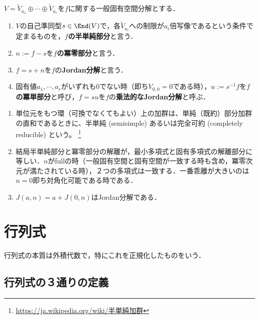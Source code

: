 \documentclass[uplatex, dvipdfmx]{jsreport}
\begin{document}
\begin{definition}
    $V=\widetilde{V}_{a_1}\oplus\cdots\oplus\widetilde{V}_{a_r}$を$f$に関する一般固有空間分解とする．
    \begin{enumerate}
        \item $V$の自己準同型$s\in\End(V)$で，各$\widetilde{V}_{a_i}$への制限が$a_i$倍写像であるという条件で定まるものを，\textbf{$f$の半単純部分}と言う．
        \item $n:=f-s$を\textbf{$f$の冪零部分}と言う．
        \item $f=s+n$を$f$の\textbf{Jordan分解}と言う．
        \item 固有値$a_1,\cdots,a_r$がいずれも$0$でない時（即ち$V_{0,0}=0$である時），$u:=s^{-1}f$を\textbf{$f$の冪単部分}と呼び，$f=su$を$f$の\textbf{乗法的なJordan分解}と呼ぶ．
    \end{enumerate}
\end{definition}
\begin{remark}\mbox{}
    \begin{enumerate}
        \item 単位元をもつ環（可換でなくてもよい）上の加群は、単純（既約）部分加群の直和であるときに、半単純 (semisimple) あるいは完全可約 (completely reducible) という。 \footnote{\url{https://ja.wikipedia.org/wiki/半単純加群}}
        \item 結局半単純部分と冪零部分の解離が，最小多項式と固有多項式の解離部分に等しい．$n$がfullの時（一般固有空間と固有空間が一致する時も含め，冪零次元が満たされている時），２つの多項式は一致する．一番乖離が大きいのは$n=0$即ち対角化可能である時である．
        \item $J(a,n)=a+J(0,n)$はJordan分解である．
    \end{enumerate}
\end{remark}

\section{行列式}

\begin{tcolorbox}[colframe=ForestGreen, colback=ForestGreen!10!white,breakable,colbacktitle=ForestGreen!40!white,coltitle=black,fonttitle=\bfseries\sffamily,
title=]
    行列式の本質は外積代数で，特にこれを正規化したものをいう．
\end{tcolorbox}

\subsection{行列式の３通りの定義}
\end{document}

